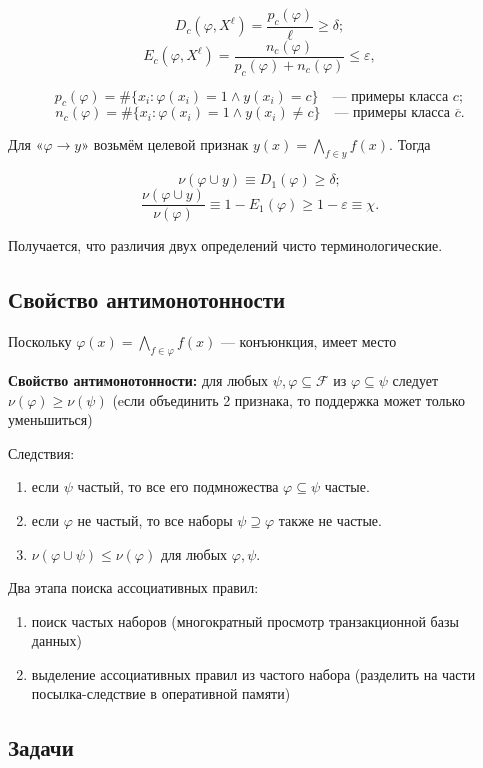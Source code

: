 \[
D_c(\varphi, X^\ell) = \frac{p_c(\varphi)}{\ell} \geq \delta;
\]
\[
E_c(\varphi, X^\ell) = \frac{n_c(\varphi)}{p_c(\varphi) + n_c(\varphi)} \leq \varepsilon,
\]

\[
p_c(\varphi) = \#\{x_i : \varphi(x_i) = 1 \land y(x_i) = c\} \quad \text{— примеры класса } c;
\]
\[
n_c(\varphi) = \#\{x_i : \varphi(x_i) = 1 \land y(x_i) \neq c\} \quad \text{— примеры класса }\overline{c}.
\]

Для «\(\varphi \rightarrow y\)» возьмём целевой признак \(y(x) = \bigwedge_{f \in y} f(x)\). Тогда

\[
\nu(\varphi \cup y) \equiv D_1(\varphi) \geq \delta;
\]
\[
\frac{\nu(\varphi \cup y)}{\nu(\varphi)} \equiv 1 - E_1(\varphi) \geq 1 - \varepsilon \equiv \chi.
\]

Получается, что различия двух определений чисто терминологические.
\subsection{Свойство антимонотонности}
Поскольку \(\varphi(x) = \bigwedge_{f \in \varphi} f(x)\) — конъюнкция, имеет место

\textbf{Свойство антимонотонности:}
для любых \(\psi, \varphi \subseteq \mathcal{F}\) из \(\varphi \subseteq \psi\) следует \(\nu(\varphi) \geq \nu(\psi)\) (eсли объединить 2 признака, то поддержка может только уменьшиться)

Следствия:
\begin{enumerate}
    \item если \(\psi\) частый, то все его подмножества \(\varphi \subseteq \psi\) частые.
    \item если \(\varphi\) не частый, то все наборы \(\psi \supseteq \varphi\) также не частые.
    \item \(\nu(\varphi \cup \psi) \leq \nu(\varphi)\) для любых \(\varphi, \psi\).
\end{enumerate}

Два этапа поиска ассоциативных правил:
\begin{enumerate}
    \item поиск частых наборов (многократный просмотр транзакционной базы данных)
    \item выделение ассоциативных правил из частого набора (разделить на части посылка-следствие в оперативной памяти)
\end{enumerate}

\subsection{Задачи}

